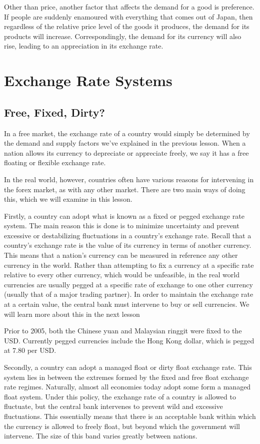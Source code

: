 \documentclass[DIV=classic,11pt,numbers=noenddot,parskip]{scrartcl}
\begin{document}
Other than price, another factor that affects the demand for a good is preference. If people are suddenly enamoured with everything that comes out of Japan, then regardless of the relative price level of the goods it produces, the demand for its products will increase. Correspondingly, the demand for its currency will also rise, leading to an appreciation in its exchange rate.
\newpage
\section{Exchange Rate Systems}
\subsection{Free, Fixed, Dirty?}
In a free market, the exchange rate of a country would simply be determined by the demand and supply factors we’ve explained in the previous lesson. When a nation allows its currency to depreciate or appreciate freely, we say it has a free floating or flexible exchange rate.

In the real world, however, countries often have various reasons for intervening in the forex market, as with any other market. There are two main ways of doing this, which we will examine in this lesson.

Firstly, a country can adopt what is known as a fixed or pegged exchange rate system. The main reason this is done is to minimize uncertainty and prevent excessive or destabilizing fluctuations in a country’s exchange rate. Recall that a country’s exchange rate is the value of its currency in terms of another currency. This means that a nation’s currency can be measured in reference any other currency in the world. Rather than attempting to fix a currency at a specific rate relative to every other currency, which would be unfeasible, in the real world currencies are usually pegged at a specific rate of exchange to one other currency (usually that of a major trading partner).  In order to maintain the exchange rate at a certain value, the central bank must intervene to buy or sell currencies. We will learn more about this in the next lesson

Prior to 2005, both the Chinese yuan and Malaysian ringgit were fixed to the USD. Currently pegged currencies include the Hong Kong dollar, which is pegged at 7.80 per USD.

Secondly, a country can adopt a managed float or dirty float exchange rate. This system lies in between the extremes formed by the fixed and free float exchange rate regimes. Naturally, almost all economies today adopt some form a managed float system.  Under this policy, the exchange rate of a country is allowed to fluctuate, but the central bank intervenes to prevent wild and excessive fluctuations. This essentially means that there is an acceptable bank within which the currency is allowed to freely float, but beyond which the government will intervene. The size of this band varies greatly between nations.
\end{document}
